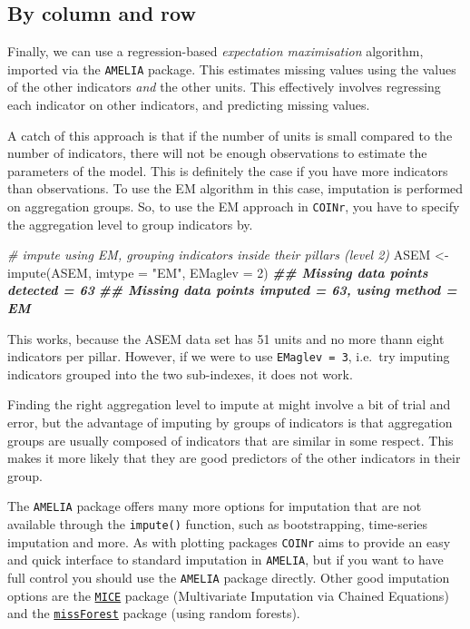 \documentclass[
]{book}
\newenvironment{Shaded}{\begin{snugshade}}{\end{snugshade}}
\newcommand{\AttributeTok}[1]{\textcolor[rgb]{0.77,0.63,0.00}{#1}}
\newcommand{\CommentTok}[1]{\textcolor[rgb]{0.56,0.35,0.01}{\textit{#1}}}
\newcommand{\DecValTok}[1]{\textcolor[rgb]{0.00,0.00,0.81}{#1}}
\newcommand{\DocumentationTok}[1]{\textcolor[rgb]{0.56,0.35,0.01}{\textbf{\textit{#1}}}}
\newcommand{\FunctionTok}[1]{\textcolor[rgb]{0.00,0.00,0.00}{#1}}
\newcommand{\NormalTok}[1]{#1}
\newcommand{\OtherTok}[1]{\textcolor[rgb]{0.56,0.35,0.01}{#1}}
\newcommand{\StringTok}[1]{\textcolor[rgb]{0.31,0.60,0.02}{#1}}
\begin{document}
\hypertarget{by-column-and-row}{%
\subsection{By column and row}\label{by-column-and-row}}

Finally, we can use a regression-based \emph{expectation maximisation} algorithm, imported via the \texttt{AMELIA} package. This estimates missing values using the values of the other indicators \emph{and} the other units. This effectively involves regressing each indicator on other indicators, and predicting missing values.

A catch of this approach is that if the number of units is small compared to the number of indicators, there will not be enough observations to estimate the parameters of the model. This is definitely the case if you have more indicators than observations. To use the EM algorithm in this case, imputation is performed on aggregation groups. So, to use the EM approach in \texttt{COINr}, you have to specify the aggregation level to group indicators by.

\begin{Shaded}
\begin{Highlighting}[]
\CommentTok{\# impute using EM, grouping indicators inside their pillars (level 2)}
\NormalTok{ASEM }\OtherTok{\textless{}{-}} \FunctionTok{impute}\NormalTok{(ASEM, }\AttributeTok{imtype =} \StringTok{"EM"}\NormalTok{, }\AttributeTok{EMaglev =} \DecValTok{2}\NormalTok{)}
\DocumentationTok{\#\# Missing data points detected = 63}
\DocumentationTok{\#\# Missing data points imputed = 63, using method = EM}
\end{Highlighting}
\end{Shaded}

This works, because the ASEM data set has 51 units and no more thann eight indicators per pillar. However, if we were to use \texttt{EMaglev\ =\ 3}, i.e.~try imputing indicators grouped into the two sub-indexes, it does not work.

Finding the right aggregation level to impute at might involve a bit of trial and error, but the advantage of imputing by groups of indicators is that aggregation groups are usually composed of indicators that are similar in some respect. This makes it more likely that they are good predictors of the other indicators in their group.

The \texttt{AMELIA} package offers many more options for imputation that are not available through the \texttt{impute()} function, such as bootstrapping, time-series imputation and more. As with plotting packages \texttt{COINr} aims to provide an easy and quick interface to standard imputation in \texttt{AMELIA}, but if you want to have full control you should use the \texttt{AMELIA} package directly. Other good imputation options are the \href{https://cran.r-project.org/web/packages/mice/index.html}{\texttt{MICE}} package (Multivariate Imputation via Chained Equations) and the \href{https://cran.rstudio.com/web/packages/missForest/index.html}{\texttt{missForest}} package (using random forests).
\end{document}
